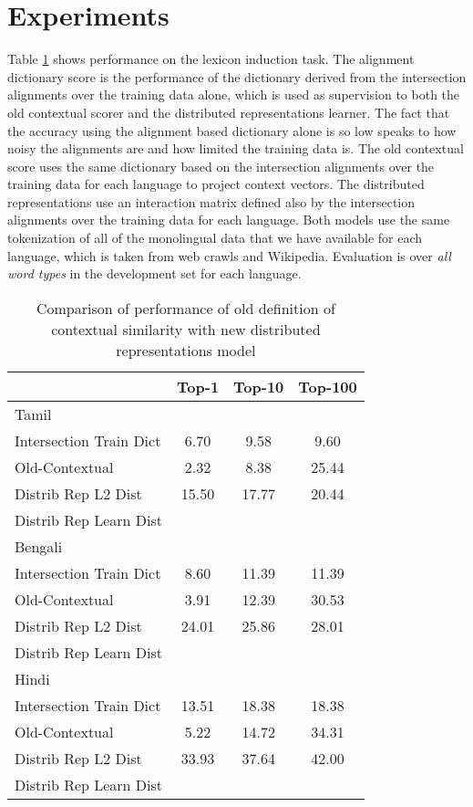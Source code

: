 \documentclass[11pt,letterpaper]{article}
\begin{document}
\section{Experiments}

Table \ref{accresults} shows performance on the lexicon induction task. 
The alignment dictionary score is the performance of the dictionary derived from the intersection alignments over the training data alone, which is used as supervision to both the old contextual scorer and the distributed representations learner.
The fact that the accuracy using the alignment based dictionary alone is so low speaks to how noisy the alignments are and how limited the training data is.
The old contextual score uses the same dictionary based on the intersection alignments over the training data for each language to project context vectors.
The distributed representations use an interaction matrix defined also by the intersection alignments over the training data for each language.
Both models use the same tokenization of all of the monolingual data that we have available for each language, which is taken from web crawls and Wikipedia.
Evaluation is over {\it all word types} in the development set  for each language.


\begin{table}
\begin{center}
\begin{tabular}{|l|c|c|c|}
\hline
& Top-1 & Top-10 & Top-100 \\
\hline
\multicolumn{4}{|l|}{Tamil}  \\
\hline
Intersection Train Dict & 6.70 & 9.58 & 9.60 \\
Old-Contextual & 2.32 & 8.38 & 25.44 \\ 
Distrib Rep L2 Dist & 15.50 & 17.77 & 20.44 \\
Distrib Rep Learn Dist & & & \\
\hline
\multicolumn{4}{|l|}{Bengali}  \\
\hline
Intersection Train Dict & 8.60 & 11.39 & 11.39 \\
Old-Contextual & 3.91 & 12.39 & 30.53 \\
Distrib Rep L2 Dist & 24.01 & 25.86 & 28.01 \\
Distrib Rep Learn Dist & & & \\
\hline
\multicolumn{4}{|l|}{Hindi}  \\
\hline
Intersection Train Dict & 13.51 & 18.38 & 18.38 \\
Old-Contextual & 5.22 & 14.72 & 34.31 \\
Distrib Rep L2 Dist & 33.93 & 37.64 & 42.00 \\
Distrib Rep Learn Dist & & & \\
\hline
\end{tabular}
\end{center}
\caption{Comparison of performance of old definition of contextual similarity with new distributed representations model}\label{accresults}
\end{table}
\end{document}
